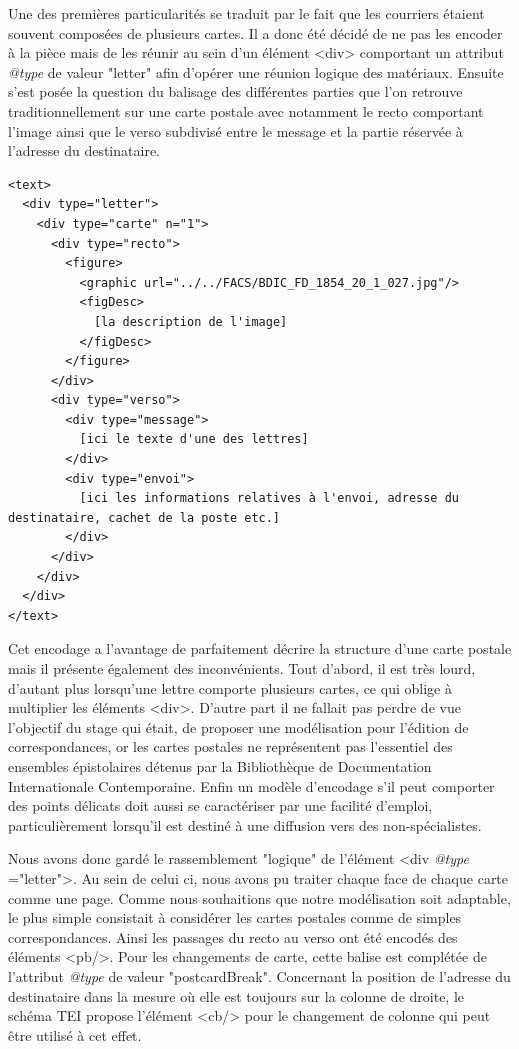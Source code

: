\documentclass[12pt,a4paper]{book} %
\begin{document}
Une des premières particularités se traduit par le fait que les courriers étaient souvent composées de plusieurs cartes. Il a donc été décidé de ne pas les encoder à la pièce mais de les réunir au sein d'un élément <div> comportant un attribut \textit{@type} de valeur "letter" afin d'opérer une réunion logique des matériaux. Ensuite s'est posée la question du balisage des différentes parties que l'on retrouve traditionnellement sur une carte postale avec notamment le recto comportant l'image ainsi que le verso subdivisé entre le message et la partie réservée à l'adresse du destinataire.
\bigskip

\begin{lstlisting}
<text>
  <div type="letter">
    <div type="carte" n="1">
      <div type="recto">
        <figure>
          <graphic url="../../FACS/BDIC_FD_1854_20_1_027.jpg"/>
          <figDesc>
            [la description de l'image]
          </figDesc>
        </figure>
      </div>
      <div type="verso">
        <div type="message">
          [ici le texte d'une des lettres]
        </div>
        <div type="envoi">
          [ici les informations relatives à l'envoi, adresse du destinataire, cachet de la poste etc.]
        </div>       
      </div>
    </div>
  </div>
</text>
\end{lstlisting}
\bigskip

Cet encodage a l'avantage de parfaitement décrire la structure d'une carte postale mais il présente également des inconvénients. Tout d'abord, il est très lourd, d'autant plus lorsqu'une lettre comporte plusieurs cartes, ce qui oblige à multiplier les éléments <div>. D'autre part il ne fallait pas perdre de vue l'objectif du stage qui était, de proposer une modélisation pour l'édition de correspondances, or les cartes postales ne représentent pas l'essentiel des ensembles épistolaires détenus par la Bibliothèque de Documentation Internationale Contemporaine. Enfin un modèle d'encodage s'il peut comporter des points délicats  doit aussi se caractériser par une facilité d'emploi, particulièrement lorsqu'il est destiné à une diffusion vers des non-spécialistes.
\medskip

Nous avons donc gardé le rassemblement "logique" de l'élément <div \textit{@type} ="letter">. Au sein de celui ci, nous avons pu traiter chaque face de chaque carte comme une page. Comme nous souhaitions que notre modélisation soit adaptable, le plus simple consistait à considérer les cartes postales comme de simples correspondances.
Ainsi les passages du recto au verso ont été encodés des éléments <pb/>. Pour les changements de carte, cette balise est complétée de l'attribut \textit{@type} de valeur "postcardBreak". Concernant la position de l'adresse du destinataire dans la mesure où elle est toujours sur la colonne de droite, le schéma TEI propose l'élément <cb/> pour le changement de colonne qui peut être utilisé à cet effet.
\bigskip
\end{document}
